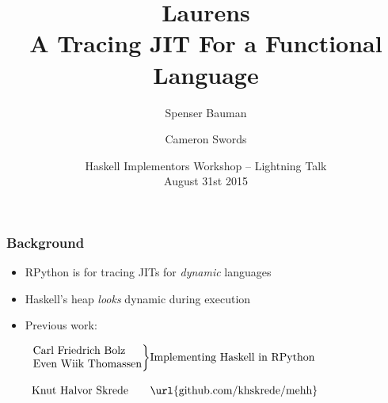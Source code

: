 \documentclass[xetex,serif,mathserif]{beamer}
\title{Laurens \\ {\normalsize A Tracing JIT For a Functional Language} }
\author[shortname]{Spenser Bauman \and Cameron Swords}
\institute[shortinst]{
    Indiana University Bloomington, USA
}
\date{Haskell Implementors Workshop -- Lightning Talk\\ August 31st 2015}
\newenvironment{slide}[1]{\begin{frame}\frametitle{#1}}{\end{frame}}
\begin{document}
\frame{\titlepage}

\begin{slide}{Background}
  \begin{itemize}
    \item RPython is for tracing JITs for \emph{dynamic} languages
    \item Haskell's heap \emph{looks} dynamic during execution
    \item Previous work:

            \vspace*{1em}
            $\begin{array}{l@{}l}\left. \begin{array}{@{}l@{}}
            \text{Carl Friedrich Bolz} \\
            \text{Even Wiik Thomassen}\\
            \end{array} \right\}  & \text{Implementing Haskell in RPython}\\\\
            \text{Knut Halvor Skrede} &  \text{\url{github.com/khskrede/mehh}}
            \end{array}$
  \end{itemize}
\end{slide}
\end{document}
